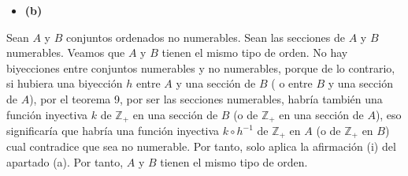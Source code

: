 \documentclass{article}
\begin{document}
\begin{itemize}
\item \bf (b)\rm
\end{itemize}
Sean $A$ y $B$ conjuntos ordenados no numerables. Sean las secciones de $A$ y $B$ numerables. Veamos que $A$ y $B$ tienen el mismo tipo de orden. No hay biyecciones entre conjuntos numerables y no numerables, porque de lo contrario, si hubiera una biyección $h$ entre $A$ y una sección de $B$  ( o entre $B$ y una sección de $A$), por el teorema 9, por ser las secciones numerables, habría también una función inyectiva $k$ de $\mathbb{Z}_{+}$ en una sección de $B$ (o de $\mathbb{Z}_{+}$ en una sección de $A$), eso significaría que habría una función inyectiva $k\circ h^{-1}$ de $\mathbb{Z}_{+}$ en $A$ (o de $\mathbb{Z}_{+}$ en $B$) cual contradice que sea no numerable. Por tanto, solo aplica la afirmación (i) del apartado (a). Por tanto, $A$ y $B$ tienen el mismo tipo de orden.
\end{document}
